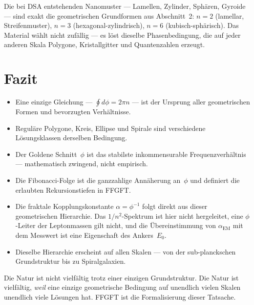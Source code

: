 Die bei DSA entstehenden Nanomuster — Lamellen, Zylinder, Sphären,
Gyroide — sind exakt die geometrischen Grundformen aus Abschnitt~2:
$n=2$ (lamellar, Streifenmuster), $n=3$ (hexagonal-zylindrisch),
$n=6$ (kubisch-sphärisch). Das Material wählt nicht zufällig —
es löst dieselbe Phasenbedingung, die auf jeder anderen Skala
Polygone, Kristallgitter und Quantenzahlen erzeugt.

\section{Fazit}

\begin{itemize}
  \item Eine einzige Gleichung — $\oint d\phi = 2\pi n$ — ist der
        Ursprung aller geometrischen Formen und bevorzugten Verhältnisse.
  \item Reguläre Polygone, Kreis, Ellipse und Spirale sind verschiedene
        Lösungsklassen derselben Bedingung.
  \item Der Goldene Schnitt~$\phi$ ist das stabilste inkommensurable
        Frequenzverhältnis — mathematisch zwingend, nicht empirisch.
  \item Die Fibonacci-Folge ist die ganzzahlige Annäherung an~$\phi$
        und definiert die erlaubten Rekursionstiefen in FFGFT.
  \item Die fraktale Kopplungskonstante $\alpha = \phi^{-1}$ folgt direkt
        aus dieser geometrischen Hierarchie. Das $1/n^2$-Spektrum ist hier
        nicht hergeleitet, eine $\phi$-Leiter der Leptonmassen gilt nicht,
        und die Übereinstimmung von $\alpha_\text{EM}$ mit dem Messwert ist
        eine Eigenschaft des Ankers~$E_0$.
  \item Dieselbe Hierarchie erscheint auf allen Skalen — von der
        sub-planckschen Grundstruktur bis zu Spiralgalaxien.
\end{itemize}

\begin{keybox}[Kernaussage]
Die Natur ist nicht vielfältig trotz einer einzigen Grundstruktur.
Die Natur ist vielfältig, \emph{weil} eine einzige geometrische
Bedingung auf unendlich vielen Skalen unendlich viele Lösungen hat.
FFGFT ist die Formalisierung dieser Tatsache.
\end{keybox}

\newpage
